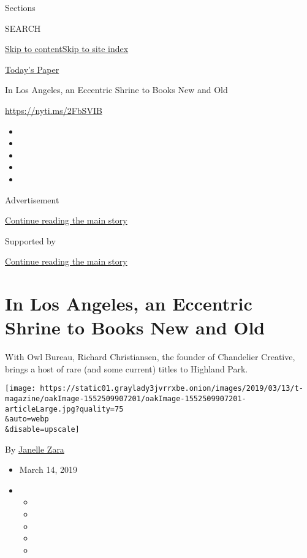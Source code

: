 Sections

SEARCH

\protect\hyperlink{site-content}{Skip to
content}\protect\hyperlink{site-index}{Skip to site index}

\href{https://myaccount.nytimes3xbfgragh.onion/auth/login?response_type=cookie\&client_id=vi}{}

\href{https://www.nytimes3xbfgragh.onion/section/todayspaper}{Today's
Paper}

In Los Angeles, an Eccentric Shrine to Books New and Old

\url{https://nyti.ms/2FbSVIB}

\begin{itemize}
\item
\item
\item
\item
\item
\end{itemize}

Advertisement

\protect\hyperlink{after-top}{Continue reading the main story}

Supported by

\protect\hyperlink{after-sponsor}{Continue reading the main story}

\hypertarget{in-los-angeles-an-eccentric-shrine-to-books-new-and-old}{%
\section{In Los Angeles, an Eccentric Shrine to Books New and
Old}\label{in-los-angeles-an-eccentric-shrine-to-books-new-and-old}}

With Owl Bureau, Richard Christiansen, the founder of Chandelier
Creative, brings a host of rare (and some current) titles to Highland
Park.

\texttt{[image: https://static01.graylady3jvrrxbe.onion/images/2019/03/13/t-magazine/oakImage-1552509907201/oakImage-1552509907201-articleLarge.jpg?quality=75\\\&auto=webp\\\&disable=upscale]}

By \href{https://www.nytimes3xbfgragh.onion/by/janelle-zara}{Janelle
Zara}

\begin{itemize}
\item
  March 14, 2019
\item
  \begin{itemize}
  \item
  \item
  \item
  \item
  \item
  \end{itemize}
\end{itemize}


